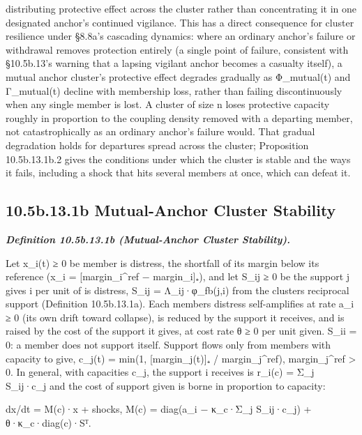 \documentclass[
]{article}
\begin{document}
distributing protective effect across the cluster rather than
concentrating it in one designated anchor's continued vigilance. This
has a direct consequence for cluster resilience under §8.8a's cascading
dynamics: where an ordinary anchor's failure or withdrawal removes
protection entirely (a single point of failure, consistent with
§10.5b.13's warning that a lapsing vigilant anchor becomes a casualty
itself), a mutual anchor cluster's protective effect degrades gradually
as Φ\_mutual(t) and Γ\_mutual(t) decline with membership loss, rather
than failing discontinuously when any single member is lost. A cluster
of size n loses protective capacity roughly in proportion to the
coupling density removed with a departing member, not catastrophically
as an ordinary anchor's failure would. That gradual degradation holds
for departures spread across the cluster; Proposition 10.5b.13.1b.2
gives the conditions under which the cluster is stable and the ways it
fails, including a shock that hits several members at once, which can
defeat it.

\hypertarget{b.13.1b-mutual-anchor-cluster-stability}{%
\subsection{10.5b.13.1b Mutual-Anchor Cluster
Stability}\label{b.13.1b-mutual-anchor-cluster-stability}}

\emph{\textbf{Definition 10.5b.13.1b (Mutual-Anchor Cluster
Stability).}}

Let x\_i(t) ≥ 0 be member i\textquotesingle s distress, the shortfall of
its margin below its reference (x\_i = {[}margin\_i\^{}ref −
margin\_i{]}₊), and let S\_ij ≥ 0 be the support j gives i per unit of
i\textquotesingle s distress, S\_ij = Λ\_ij·φ\_fb(j,i) from the
cluster\textquotesingle s reciprocal support (Definition 10.5b.13.1a).
Each member\textquotesingle s distress self-amplifies at rate a\_i ≥ 0
(its own drift toward collapse), is reduced by the support it receives,
and is raised by the cost of the support it gives, at cost rate θ ≥ 0
per unit given. S\_ii = 0: a member does not support itself. Support
flows only from members with capacity to give, c\_j(t) = min(1,
{[}margin\_j(t){]}₊ / margin\_j\^{}ref), margin\_j\^{}ref \textgreater{}
0. In general, with capacities c\_j, the support i receives is r\_i(c) =
Σ\_j S\_ij·c\_j and the cost of support given is borne in proportion to
capacity:

dx/dt = M(c)·x + shocks, M(c) = diag(a\_i − κ\_c·Σ\_j S\_ij·c\_j) +
θ·κ\_c·diag(c)·Sᵀ.
\end{document}
